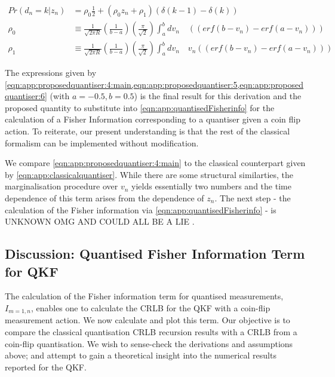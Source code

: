 \begin{align}
Pr(d_n=k | z_n) & = \rho_0 \frac{1}{2} + (\rho_0 z_n + \rho_1)\left( \delta(k-1) - \delta(k) \right)  \label{eqn:app:proposedquantiser:4:main}\\ 
\rho_0 & \equiv  \frac{1}{\sqrt{2\pi R}} \left( \frac{1}{b-a} \right) \left( \frac{\pi}{\sqrt{2}} \right) \int_{a}^{b} dv_n \quad  \left( \left( erf(b - v_n) - erf(a - v_n)\right)  \right) \label{eqn:app:proposedquantiser:5}\\
\rho_1 &  \equiv \frac{1}{\sqrt{2\pi R}} \left( \frac{1}{b-a} \right) \left( \frac{\pi}{\sqrt{2}} \right)  \int_{a}^{b} dv_n \quad  v_n \left( \left( erf(b - v_n) - erf(a - v_n)\right)  \right) \label{eqn:app:proposedquantiser:6} 
\end{align}

The expressions given by \cref{eqn:app:proposedquantiser:4:main,eqn:app:proposedquantiser:5,eqn:app:proposedquantiser:6} (with $a= -0.5, b=0.5$) is the final result for this derivation and the proposed quantity to substitute into \cref{eqn:app:quantisedFisherinfo} for the calculation of a Fisher Information corresponding to a quantiser given a coin flip action. To reiterate, our present understanding is that the rest of the classical formalism can be implemented without modification. 

We compare \cref{eqn:app:proposedquantiser:4:main} to the classical counterpart given by  \cref{eqn:app:classicalquantiser}. While there are some structural similarties, the marginalisation procedure over $v_n$  yields essentially two numbers and the time dependence of this term arises from the dependence of $z_n$. The next step - the calculation of the Fisher information via \cref{eqn:app:quantisedFisherinfo} - is UNKNOWN OMG AND COULD ALL BE A LIE .

\subsection{Discussion: Quantised Fisher Information Term for QKF}

The calculation of the Fisher information term for quantised measurements, $I_{m=1, n}$, enables one to calculate the CRLB for the QKF with a coin-flip measurement action. We now calculate and plot this term. Our objective is to compare the classical quantisation CRLB recursion results with a CRLB from a coin-flip quantisation. We wish to sense-check the derivations and assumptions above; and attempt to gain a theoretical insight into the numerical results reported for the QKF. 


